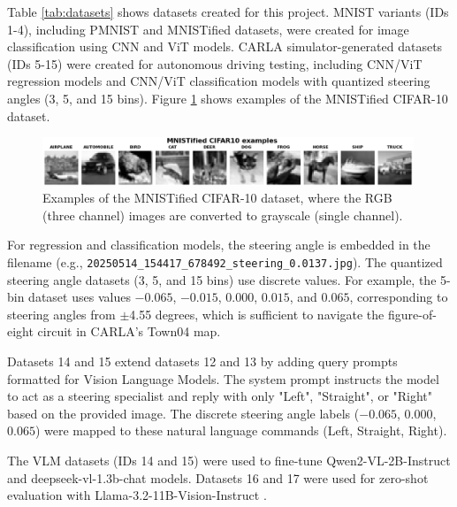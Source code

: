 Table \ref{tab:datasets} shows datasets created for this project. MNIST variants (IDs 1-4), including PMNIST and MNISTified datasets, were created for image classification using CNN and ViT models. CARLA simulator-generated datasets (IDs 5-15) were created for autonomous driving testing, including CNN/ViT regression models and CNN/ViT classification models with quantized steering angles (3, 5, and 15 bins). Figure \ref{fig:mnistified_cifar10} shows examples of the MNISTified CIFAR-10 dataset.

\begin{figure}[h]
\centering
\includegraphics[width=0.99\textwidth]{Figures/Results/mnistified_cifar10.png}
\caption{Examples of the MNISTified CIFAR-10 dataset, where the RGB (three channel) images are converted to grayscale (single channel).}
\label{fig:mnistified_cifar10}
\end{figure}

For regression and classification models, the steering angle is embedded in the filename (e.g., \texttt{20250514\_154417\_678492\_steering\_0.0137.jpg}). The quantized steering angle datasets (3, 5, and 15 bins) use discrete values. For example, the 5-bin dataset uses values $-0.065$, $-0.015$, $0.000$, $0.015$, and $0.065$, corresponding to steering angles from $\pm$4.55 degrees, which is sufficient to navigate the figure-of-eight circuit in CARLA's Town04 map.

Datasets 14 and 15 extend datasets 12 and 13 by adding query prompts formatted for Vision Language Models. The system prompt instructs the model to act as a steering specialist and reply with only "Left", "Straight", or "Right" based on the provided image. The discrete steering angle labels ($-0.065$, $0.000$, $0.065$) were mapped to these natural language commands (Left, Straight, Right).

The VLM datasets (IDs 14 and 15) were used to fine-tune Qwen2-VL-2B-Instruct \cite{bai2023qwen} and deepseek-vl-1.3b-chat \cite{zeng2024deepseek} models. Datasets 16 and 17 were used for zero-shot evaluation with Llama-3.2-11B-Vision-Instruct \cite{meta2024llama3vision}.
